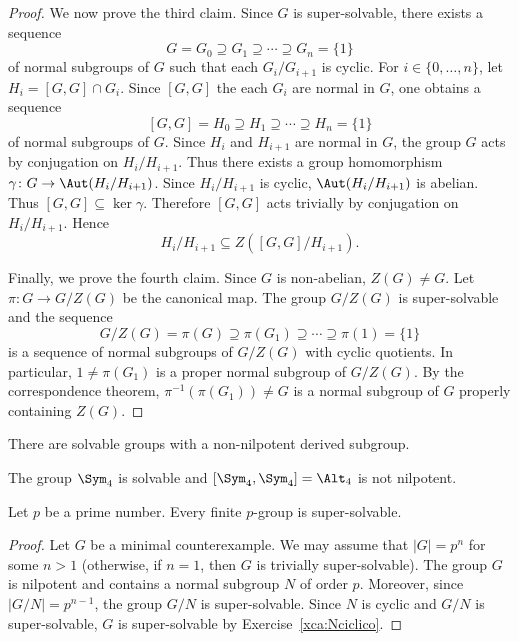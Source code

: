 \begin{proof}
We now prove the third claim. Since $G$ is super-solvable, 
there exists a sequence
	\[
	G=G_0\supseteq G_1\supseteq\cdots\supseteq G_n=\{1\}
	\]
of normal subgroups of $G$ such that each 
$G_i/G_{i+1}$ is cyclic. For  
	$i\in\{0,\dots,n\}$, let $H_i=[G,G]\cap G_i$. Since $[G,G]$ the each 
 $G_i$ are normal in $G$, one obtains a sequence 
	\[
	[G,G]=H_0\supseteq H_1\supseteq\cdots\supseteq H_n=\{1\}
	\]
of normal subgroups of $G$. Since $H_i$ and $H_{i+1}$ are normal in $G$, 
the group $G$ acts by conjugation on $H_i/H_{i+1}$. Thus there exists a group
homomorphism 
	$\gamma\colon G\to\Aut(H_i/H_{i+1})$. Since $H_i/H_{i+1}$ is cyclic, 
	$\Aut(H_i/H_{i+1})$ is abelian. Thus $[G,G]\subseteq\ker \gamma$. Therefore 
	$[G,G]$ acts trivially by conjugation on $H_{i}/H_{i+1}$. Hence 
 	\[
	H_i/H_{i+1}\subseteq Z([G,G]/H_{i+1}).
	\]

 Finally, we prove the fourth claim. Since $G$ is non-abelian,
	$Z(G)\ne G$. Let $\pi\colon G\to G/Z(G)$ be the canonical map. The group 
	$G/Z(G)$ is super-solvable and the sequence 
	\[
	G/Z(G)=\pi(G)\supseteq \pi(G_1)\supseteq\cdots\supseteq \pi(1)=\{1\}
	\]
is a sequence of normal subgroups of $G/Z(G)$ with cyclic quotients. 
In particular, $1\ne \pi(G_1)$ is a proper normal subgroup of $G/Z(G)$. By the correspondence theorem, $\pi^{-1}(\pi(G_1))\ne G$ is a normal subgroup of 
$G$ properly containing $Z(G)$. 
\end{proof}

There are solvable groups with a non-nilpotent derived subgroup. 

\begin{example}
The group $\Sym_4$ is solvable and $[\Sym_4,\Sym_4]=\Alt_4$ is not nilpotent.
\end{example}

\begin{proposition}
\label{pro:psuper}
Let $p$ be a prime number. Every finite $p$-group is super-solvable.
\end{proposition}

\begin{proof}
Let $G$ be a minimal counterexample. We may assume that $|G|=p^n$ for some 
$n>1$ (otherwise, if $n=1$, then $G$ is trivially super-solvable). 
The group $G$ is nilpotent and contains a normal subgroup $N$ of order $p$. 
Moreover, since $|G/N|=p^{n-1}$, the group $G/N$ is super-solvable. 
Since $N$ is cyclic and $G/N$ is super-solvable, 
$G$ is super-solvable by Exercise~\ref{xca:Nciclico}.
\end{proof}

